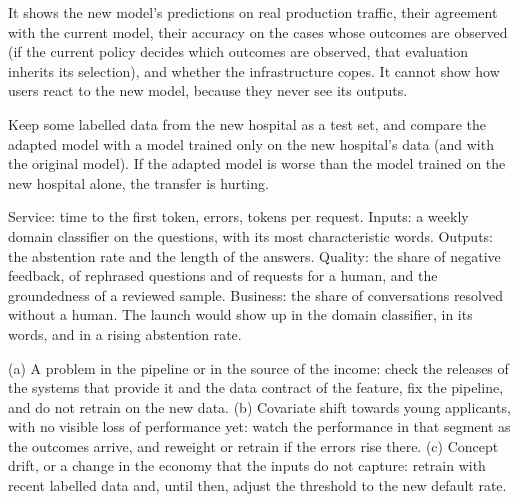 \begin{description}[font=\bfseries,leftmargin=0pt,itemsep=5pt]
  \item[\ref{exr6:shadow}] It shows the new model's predictions on real production traffic, their agreement with the current model, their
        accuracy on the cases whose outcomes are observed (if the current policy decides which outcomes are
        observed, that evaluation inherits its selection), and whether the infrastructure copes. It cannot show how users react to the new model, because
        they never see its outputs.
  \item[\ref{exr6:negative}] Keep some labelled data from the new hospital as a test set, and compare the adapted model with a model
        trained only on the new hospital's data (and with the original model). If the adapted model is worse than the model trained on
        the new hospital alone, the transfer is hurting.
  \item[\ref{exr6:chatbot}] Service: time to the first token, errors, tokens per request. Inputs: a weekly domain classifier
        on the questions, with its most characteristic words. Outputs: the abstention rate and the length of the answers.
        Quality: the share of negative feedback, of rephrased questions and of requests for a human, and the groundedness of a
        reviewed sample. Business: the share of conversations resolved without a human. The launch would show up in the domain
        classifier, in its words, and in a rising abstention rate.
\item[\ref{exr6:diagnose}] (a) A problem in the pipeline or in the source of the income: check the
releases of the systems that provide it and the data contract of the feature, fix the pipeline, and do
not retrain on the new data. (b) Covariate shift towards young applicants, with no
visible loss of performance yet: watch the performance in that segment as the outcomes arrive, and
reweight or retrain if the errors rise there. (c) Concept drift, or a change in the
economy that the inputs do not capture: retrain with recent labelled data and, until then, adjust the
threshold to the new default rate.
\end{description}


